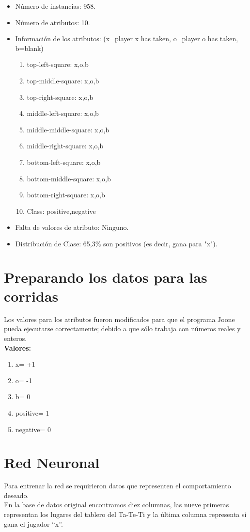 \documentclass[12pt,titlepage]{article}
\begin{document}
\begin{itemize}
 \item N\'umero de instancias: 958.
 \item N\'umero de atributos: 10.
 \item Informaci\'on de los atributos: (x=player x has taken, o=player o has taken, b=blank)
    \begin{enumerate}
      \item top-left-square: {x,o,b}
      \item top-middle-square: {x,o,b}
      \item top-right-square: {x,o,b}
      \item middle-left-square: {x,o,b}
      \item middle-middle-square: {x,o,b}
      \item middle-right-square: {x,o,b}
      \item bottom-left-square: {x,o,b}
      \item bottom-middle-square: {x,o,b}
      \item bottom-right-square: {x,o,b}
      \item Class: {positive,negative}
    \end{enumerate}
 \item Falta de valores de atributo: Ninguno.
 \item Distribución de Clase: 65,3\% son positivos (es decir, gana para "x").
\end{itemize}

\section{Preparando los datos para las corridas}
Los valores para los atributos fueron modificados para que el programa Joone pueda ejecutarse correctamente;
debido a que s\'olo trabaja con n\'umeros reales y enteros. \\
{\bf{Valores:}}
    \begin{enumerate}
      \item x= +1
      \item o= -1
      \item b= 0
      \item positive= 1
      \item negative= 0
    \end{enumerate}

\section{Red Neuronal}
Para entrenar la red se requirieron datos que representen el comportamiento deseado. \\
En la base de datos original encontramos diez columnas, las nueve primeras representan los lugares del tablero del Ta-Te-Ti y la \'ultima columna representa si gana el jugador ``x''.
\end{document}
